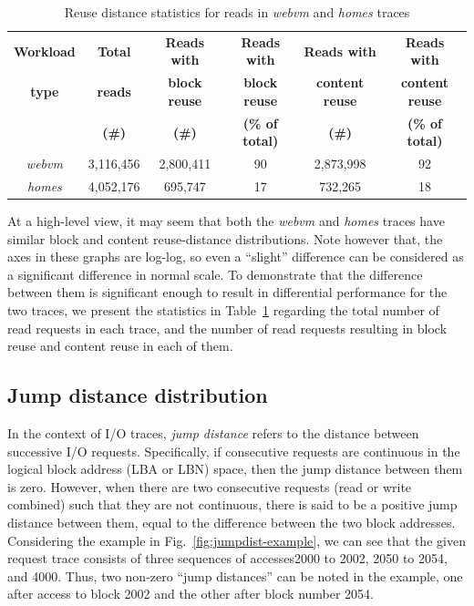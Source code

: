 \begin{table}[t]
 \caption{Reuse distance statistics for reads in \textit{webvm} and \textit{homes} traces}
 \begin{center}
 \begin{tabular}{|c|c|c|c|c|c|} \hline
   \bf{Workload} & \bf{Total} & \bf{Reads with} & \bf{Reads with} & \bf{Reads with} & \bf{Reads with} \\
  \bf{type} & \bf{reads} & \bf{block reuse} & \bf{block reuse} & \bf{content reuse} & \bf{content reuse} \\ 
	    & \bf{(\#)} & \bf{(\#)} & \bf{(\% of total)} & \bf{(\#)} & \bf{(\% of total)} \\ \hline  
  \textit{webvm} & 3,116,456 & 2,800,411 & 90 & 2,873,998 & 92 \\
  \textit{homes} & 4,052,176 & 695,747 & 17 & 732,265  & 18 \\ \hline
 \end{tabular}
 \label{tab:reuse-dist-read-summary}
 \end{center}
 \end{table}
At a high-level view, it may seem that both the \textit{webvm} and \textit{homes}
traces have similar block and content reuse-distance distributions. Note however that,
the axes in these graphs are log-log, so even a ``slight'' difference
can be considered as a significant difference in normal scale. 
To demonstrate that the difference between
them is significant enough to result in differential performance for the two traces, 
we present the statistics in 
Table~\ref{tab:reuse-dist-read-summary} regarding the total number of 
read requests in each trace, and the number of read requests resulting
in block reuse and content reuse in each of them.



\subsection{Jump distance distribution}
In the context of I/O traces, \textit{jump distance} refers to the
distance between successive I/O requests. Specifically, if consecutive
requests are continuous in the logical block address (LBA or LBN) space, 
then the jump distance between them is zero. However, when there are
two consecutive requests (read or write combined) such that they are
not continuous, there is said to be a positive jump distance between
them, equal to the difference between the two block addresses.
Considering the example in Fig.~\ref{fig:jumpdist-example}, we can see
that the given request trace consists of three sequences of 
accesses\textemdash{}2000 to 2002, 2050 to 2054, and 4000. Thus, two non-zero
``jump distances'' can be noted in the example, one after access to
block 2002 and the other after block number 2054.


